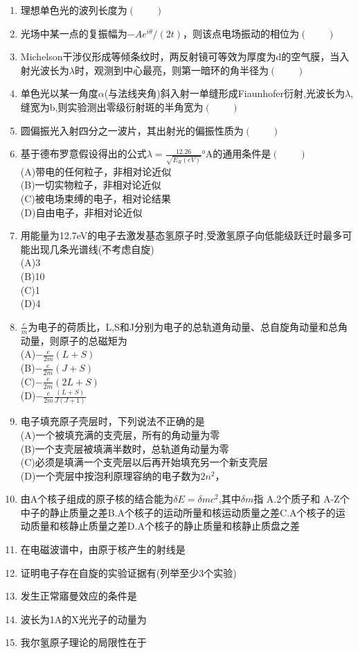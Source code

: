 \begin{enumerate}
(D)右旋椭圆偏振光
\item 理想单色光的波列长度为$(\qquad)$
\item 光场中某一点的复振幅为$-Ae^{i\theta}/ (2t)$，则该点电场振动的相位为$(\qquad)$
\item Michelson干涉仪形成等倾条纹时，两反射镜可等效为厚度为d的空气膜，当入射光波长为$\lambda$时，观测到中心最亮，则第一暗环的角半径为$(\qquad)$
\item 单色光以某一角度$\alpha$(与法线夹角)斜入射一单缝形成Fiaunhofer衍射,光波长为$\lambda$,缝宽为b,则实验测出零级衍射斑的半角宽为$(\qquad)$
\item 圆偏振光入射四分之一波片，其出射光的偏振性质为$(\qquad)$
\item 基于德布罗意假设得出的公式$\lambda=\frac{12.26}{\sqrt{E_R(eV)}}$°A的通用条件是$(\qquad)$\\
(A)带电的任何粒子，非相对论近似\\
(B)一切实物粒子，非相对论近似\\
(C)被电场束缚的电子，相对论结果\\
(D)自由电子，非相对论近似
\item 用能量为12.7eV的电子去激发基态氢原子时,受激氢原子向低能级跃迁时最多可能出现几条光谱线(不考虑自旋)\\
(A)3\\
(B)10\\
(C)1\\
(D)4
\item $\frac{e}{m}$为电子的荷质比，L,S和J分别为电子的总轨道角动量、总自旋角动量和总角动量，则原子的总磁矩为\\
(A)$\displaystyle -\frac{e}{2m}(L+S)$\\
(B)$\displaystyle -\frac{e}{2m}(J+S)$\\
(C)$\displaystyle -\frac{e}{2m}(2L+S)$\\
(D)$\displaystyle -\frac{e}{2m}\frac{(L+S)}{J(J+1)}$
\item 电子填充原子壳层时，下列说法不正确的是\\
(A)一个被填充满的支壳层，所有的角动量为零\\
(B)一个支壳层被填满半数时，总轨道角动量为零\\
(C)必须是填满一个支壳层以后再开始填充另一个新支壳层\\
(D)一个壳层中按泡利原理容纳的电子数为$2n^2$，
\item 由A个核子组成的原子核的结合能为$\delta E=\delta mc^2$,其中$\delta m$指
A.2个质子和 A-Z个中子的静止质量之差B.A个核子的运动所量和核运动质量之差C.A个核子的运动质量和核静止质量之差D.A个核子的静止质量和核静止质盘之差
\item 在电磁波谱中，由原于核产生的射线是
\item 证明电子存在自旋的实验证据有(列举至少3个实验)
\item 发生正常寤曼效应的条件是
\item 波长为1A的X光光子的动量为
\item 我尔氢原子理论的局限性在于
\end{enumerate}
